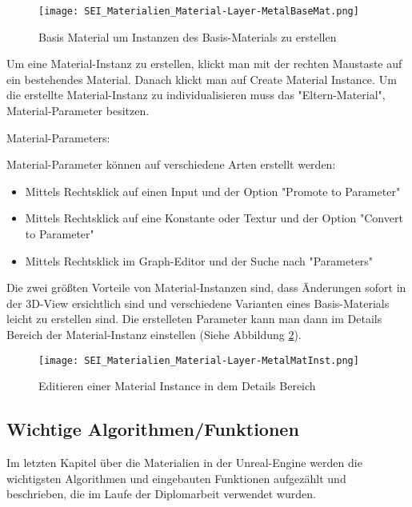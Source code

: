 \begin{figure}[H]
    \centering
    \texttt{[image: SEI\_Materialien\_Material-Layer-MetalBaseMat.png]}
    \caption{Basis Material um Instanzen des Basis-Materials zu erstellen}
    \label{picture:base_metal_material}
\end{figure}

Um eine Material-Instanz zu erstellen, klickt man mit der rechten Maustaste auf ein bestehendes Material. Danach klickt
man auf Create Material Instance. Um die erstellte Material-Instanz zu individualisieren muss das "Eltern-Material",
Material-Parameter besitzen.

Material-Parameters:

    Material-Parameter können auf verschiedene Arten  erstellt werden:
    \begin{itemize}
        \item  Mittels Rechtsklick auf einen Input und der Option "Promote to Parameter"
        \item  Mittels Rechtsklick auf eine Konstante oder Textur und der Option "Convert to Parameter"
        \item  Mittels Rechtsklick im Graph-Editor und der Suche nach "Parameters"
    \end{itemize}

Die zwei größten Vorteile von Material-Instanzen sind, dass Änderungen sofort in der 3D-View ersichtlich sind und
verschiedene Varianten eines Basis-Materials leicht zu erstellen sind. Die erstelleten Parameter kann man dann im
Details Bereich der Material-Instanz einstellen (Siehe Abbildung \ref{picture:edit_mat_instance}).

\begin{figure}[H]
    \centering
    \texttt{[image: SEI\_Materialien\_Material-Layer-MetalMatInst.png]}
    \caption{Editieren einer Material Instance in dem Details Bereich}
    \label{picture:edit_mat_instance}
\end{figure}

\subsection{Wichtige Algorithmen/Funktionen}
\label{sec:algorithms}

Im letzten Kapitel über die Materialien in der Unreal-Engine werden die wichtigsten Algorithmen und eingebauten
Funktionen aufgezählt und beschrieben, die im Laufe der Diplomarbeit verwendet wurden.

